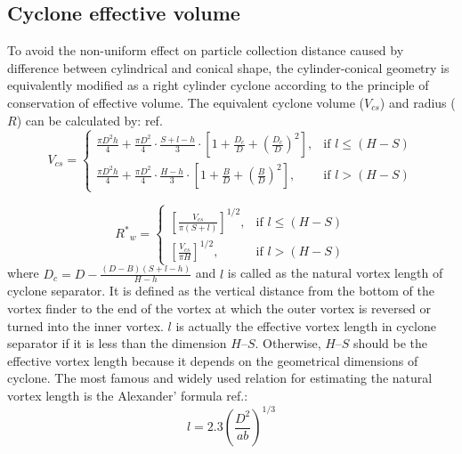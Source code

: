\subsection{Cyclone effective volume}
To avoid the non-uniform effect on particle collection distance caused by difference between cylindrical and conical shape, the cylinder-conical geometry is equivalently modified as a right cylinder cyclone according to the principle of conservation of effective volume.
The equivalent cyclone volume ($V_{cs}$) and  radius ($R$) can be calculated by: ref.\cite{Zhao2011}
\begin{equation}
	V_{cs}=
	\begin{cases}
		 \frac{\pi D^2 h}{4} +\frac{\pi D^2 }{4} \cdot \frac{S+l-h}{3} \cdot \left[ 1+ \frac{D_c}{D}+ \left(\frac{D_c}{D} \right)^2  \right] ,& \text{if } l\leq (H-S)\\
		\frac{\pi D^2 h}{4} +\frac{\pi D^2 }{4} \cdot \frac{H-h}{3} \cdot \left[ 1+ \frac{B}{D}+ \left(\frac{B}{D} \right)^2  \right],& \text{if } l> (H-S)
	\end{cases}
\end{equation}



\begin{equation} \label{effective_radious_equation}
	{R^*} _w= 
	\begin{cases}
		\left[ \frac{V_{cs}}{\pi (S+l)}\right]^{1/2} ,& \text{if } l\leq (H-S)\\
		\left[ \frac{V_{cs}}{\pi H}\right]^{1/2},& \text{if } l> (H-S)
	\end{cases}
\end{equation}
where $D_c= D - \frac{(D-B)(S+l-h)}{H-h}$ and $l$ is called as the natural vortex length of cyclone separator. It is defined as the vertical distance from the bottom of the vortex finder to the end of the vortex at which the outer vortex is reversed or turned into the inner vortex. $l$ is actually the effective vortex length in cyclone separator if it is less than the dimension $H–S$. Otherwise, $H–S$ should be the effective vortex length because it depends on the geometrical dimensions of cyclone.
The most famous and widely used relation for estimating the natural vortex length is the Alexander’ formula ref.\cite{Zhao2011}: 
\begin{equation}
	l=2.3 \left( \frac{D^2}{a b}\right)^{1/3}
\end{equation}

